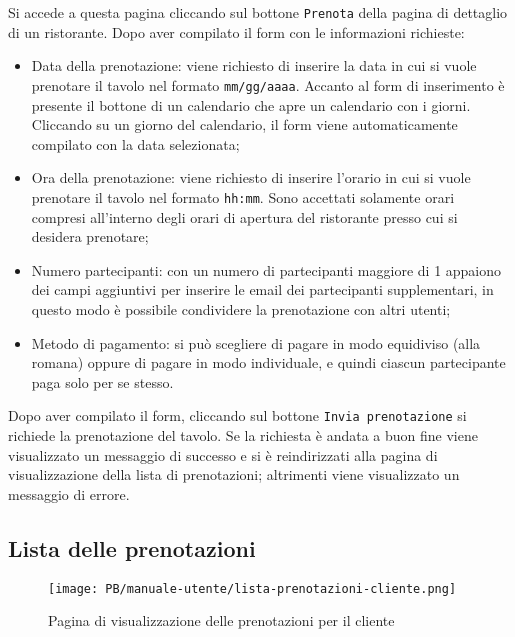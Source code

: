 Si accede a questa pagina cliccando sul bottone \texttt{Prenota} della pagina di
dettaglio di un ristorante. Dopo aver compilato il form con le informazioni
richieste:
\begin{itemize}
	\item Data della prenotazione: viene richiesto di inserire la data in cui si
		vuole prenotare il tavolo nel formato \texttt{mm/gg/aaaa}. Accanto al
		form di inserimento è presente il bottone di un calendario che apre un
		calendario con i giorni. Cliccando su un giorno del calendario, il form
		viene automaticamente compilato con la data selezionata;

	\item Ora della prenotazione: viene richiesto di inserire l'orario in cui si
		vuole prenotare il tavolo nel formato \texttt{hh:mm}. Sono accettati
		solamente orari compresi all'interno degli orari di apertura del
		ristorante presso cui si desidera prenotare;

	\item Numero partecipanti: con un numero di partecipanti maggiore di 1
		appaiono dei campi aggiuntivi per inserire le email dei partecipanti
		supplementari, in questo modo è possibile condividere la prenotazione
		con altri utenti;

	\item Metodo di pagamento: si può scegliere di pagare in modo equidiviso
		(alla romana) oppure di pagare in modo individuale, e quindi ciascun
		partecipante paga solo per se stesso.
\end{itemize}

Dopo aver compilato il form, cliccando sul bottone \texttt{Invia prenotazione} 
si richiede la prenotazione del tavolo. Se la richiesta è andata a buon fine
viene visualizzato un messaggio di successo e si è reindirizzati alla pagina di
visualizzazione della lista di prenotazioni; altrimenti viene visualizzato un
messaggio di errore.

\subsection{Lista delle prenotazioni}
\begin{figure}[htbp]
    \centering
	\texttt{[image: PB/manuale-utente/lista-prenotazioni-cliente.png]}
    \caption{Pagina di visualizzazione delle prenotazioni per il cliente}
\end{figure}

